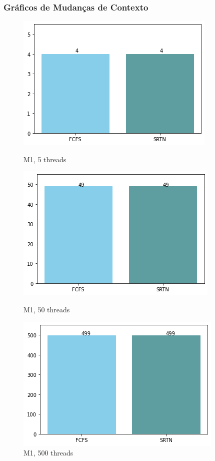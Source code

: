 \documentclass{beamer}
\begin{document}
\begin{frame}
\frametitle{Gráficos de Mudanças de Contexto}

\blindtext

\begin{figure}[!htb]
  \includegraphics[width=\linewidth]{imgs/contex5-1}
  \caption{M1, 5 threads}\label{fig:awesome_image1}
\endminipage\hfill
{}
  \includegraphics[width=\linewidth]{imgs/contex50-1}
  \caption{M1, 50 threads}\label{fig:awesome_image2}
\endminipage\hfill
{}%
  \includegraphics[width=\linewidth]{imgs/contex500-1}
  \caption{M1, 500 threads}\label{fig:awesome_image3}
\endminipage
\end{figure}


\end{frame}
\end{document}
